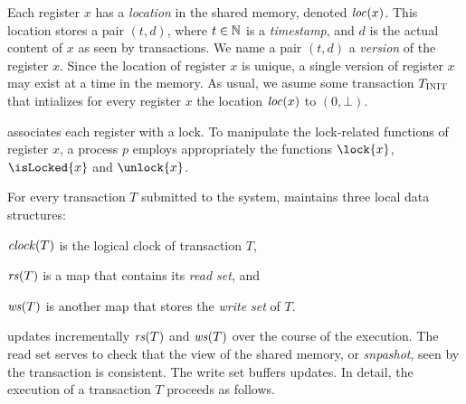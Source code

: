 Each register $x$ has a \emph{location} in the shared memory, denoted $\locationOf{x}$.
This location stores a pair $(t,d)$, where $t \in \naturalSet$ is a \emph{timestamp}, and $d$ is the actual content of $x$ as seen by transactions.
We name a pair $(t,d)$ a \emph{version} of the register $x$.
Since the location of register $x$ is unique, a single version of register $x$ may exist at a time in the memory.
As usual, we asume some transaction $\transInit$ that intializes for every register $x$ the location $\locationOf{x}$ to $(0,\bot)$.

 associates each register with a lock.
To manipulate the lock-related functions of register $x$, 
a process $p$ employs appropriately the functions $\lock{x}$, $\isLocked{x}$ and $\unlock{x}$.

For every transaction $T$ submitted to the system,  maintains three local data structures:
\begin{inparaenum}[]
\item $\clockOf{T}$ is the logical clock of transaction $T$,
\item $\readSetOf{T}$ is a map that contains its \emph{read set}, and 
\item $\writeSetOf{T}$ is another map that stores the \emph{write set} of $T$.
\end{inparaenum}
 updates incrementally $\readSetOf{T}$ and $\writeSetOf{T}$ over the course of the execution.
The read set serves to check that the view of the shared memory, or \emph{snpashot}, seen by the transaction is consistent.
The write set buffers updates.
In detail, the execution of a transaction $T$ proceeds as follows.

